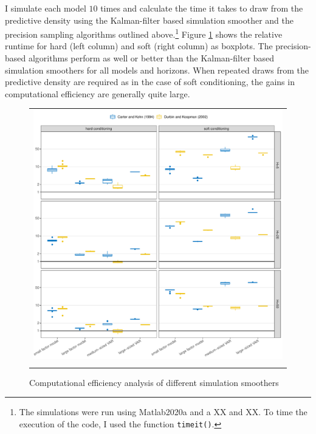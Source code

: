 \documentclass[notitlepage,a4paper,12pt]{article}
\begin{document}
\begin{ThreePartTable}
I simulate each model $10$ times and calculate the time it takes to draw from the predictive density using the Kalman-filter based simulation smoother and the precision sampling algorithms outlined above.\footnote{The simulations were run using Matlab2020a and a XX and XX. To time the execution of the code, I used the function \texttt{timeit()}.} Figure \ref{figsimulation} shows the relative runtime for hard (left column) and soft (right column) as boxplots. The precision-based algorithms perform as well or better than the Kalman-filter based simulation smoothers for all models and horizons. When repeated draws from the predictive density are required as in the case of soft conditioning, the gains in computational efficiency are generally quite large. 

\begin{figure}[htbp] \centering
    \caption{Computational efficiency analysis of different simulation smoothers \label{figsimulation}}
    \footnotesize
    \begin{tabular}{p{16cm}}
    \multicolumn{1}{c}{\includegraphics*[scale = 0.6]{../figures/fig_simulations_Ncond_10.pdf}} \\
    {
}
\end{tabular}
\end{figure}
\end{ThreePartTable}
\end{document}
